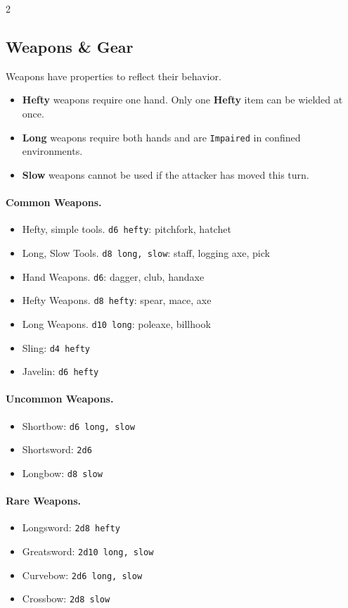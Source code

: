 \documentclass{osr-template/zine}
\begin{document}
\begin{multicols*}{2}
\newcolumn

\subsection*{Weapons \& Gear}

Weapons have properties to reflect their behavior.

\begin{itemize}[nosep]
    \item \textbf{Hefty} weapons require one hand. Only one \textbf{Hefty} item can be wielded at once.
    \item \textbf{Long} weapons require both hands and are \texttt{Impaired} in confined environments.
    \item \textbf{Slow} weapons cannot be used if the attacker has moved this turn.
\end{itemize}
\paragraph{Common Weapons.}
\begin{itemize}[nosep, leftmargin=*]
    \item [] Hefty, simple tools. \texttt{d6 hefty}: pitchfork, hatchet
    \item [] Long, Slow Tools. \texttt{d8 long, slow}: staff, logging axe, pick
    \item [] Hand Weapons. \texttt{d6}: dagger, club, handaxe
    \item [] Hefty Weapons. \texttt{d8 hefty}: spear, mace, axe
    \item [] Long Weapons. \texttt{d10 long}: poleaxe, billhook
    \item [] Sling: \texttt{d4 hefty}
    \item [] Javelin: \texttt{d6 hefty}
\end{itemize}
\paragraph{Uncommon Weapons.}
\begin{itemize}[nosep, leftmargin=*]
    \item [] Shortbow: \texttt{d6 long, slow}
    \item [] Shortsword: \texttt{2d6}
    \item [] Longbow: \texttt{d8 slow}
\end{itemize}
\paragraph{Rare Weapons.}
\begin{itemize}[nosep, leftmargin=*]
    \item [] Longsword: \texttt{2d8 hefty}
    \item [] Greatsword: \texttt{2d10 long, slow}
    \item [] Curvebow: \texttt{2d6 long, slow}
    \item [] Crossbow: \texttt{2d8 slow}
\end{itemize}


\end{multicols*}
\end{document}
